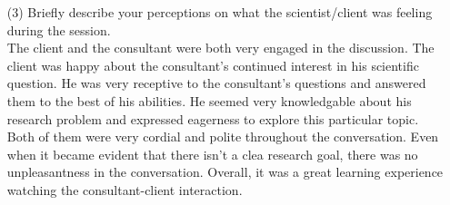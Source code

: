 \documentclass[12pt,a4paper]{article}
\begin{document}
\begin{enumerate}
\item [(3)] Briefly describe your perceptions on what the scientist/client was feeling during the session. \\
The client and the consultant were both very engaged in the discussion. The client was happy about the consultant's continued interest in his scientific question. He was very receptive to the consultant's questions and answered them to the best of his abilities. He seemed very knowledgable about his research problem and expressed eagerness to explore this particular topic. Both of them were very cordial and polite throughout the conversation. Even when it became evident that there isn't a clea research goal, there was no unpleasantness in the conversation. Overall, it was a great learning experience watching the consultant-client interaction.
\end{enumerate}
\end{document}
